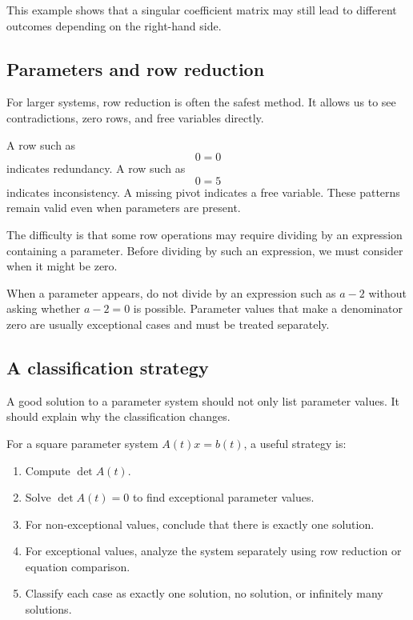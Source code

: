 This example shows that a singular coefficient matrix may still lead to different outcomes depending on the right-hand side.

\subsection*{Parameters and row reduction}

For larger systems, row reduction is often the safest method. It allows us to see contradictions, zero rows, and free variables directly.

A row such as
\[
0=0
\]
indicates redundancy. A row such as
\[
0=5
\]
indicates inconsistency. A missing pivot indicates a free variable. These patterns remain valid even when parameters are present.

The difficulty is that some row operations may require dividing by an expression containing a parameter. Before dividing by such an expression, we must consider when it might be zero.

\begin{remarkbox}
When a parameter appears, do not divide by an expression such as \(a-2\) without asking whether \(a-2=0\) is possible. Parameter values that make a denominator zero are usually exceptional cases and must be treated separately.
\end{remarkbox}

\subsection*{A classification strategy}

A good solution to a parameter system should not only list parameter values. It should explain why the classification changes.

\begin{summarybox}
For a square parameter system \(A(t)x=b(t)\), a useful strategy is:
\begin{enumerate}
\item Compute \(\det A(t)\).
\item Solve \(\det A(t)=0\) to find exceptional parameter values.
\item For non-exceptional values, conclude that there is exactly one solution.
\item For exceptional values, analyze the system separately using row reduction or equation comparison.
\item Classify each case as exactly one solution, no solution, or infinitely many solutions.
\end{enumerate}
\end{summarybox}

